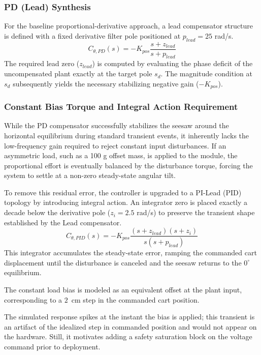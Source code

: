\documentclass[11pt,a4paper]{article}
\begin{document}
\subsubsection{PD (Lead) Synthesis}\label{subsub:pd_tuning}
For the baseline proportional-derivative approach, a lead compensator structure is defined with a fixed derivative filter pole positioned at $p_{lead} = 25$ rad/s.
\begin{equation}
C_{\theta,PD}(s) = -K_{pos} \frac{s + z_{lead}}{s + p_{lead}}
\end{equation}
The required lead zero ($z_{lead}$) is computed by evaluating the phase deficit of the uncompensated plant exactly at the target pole $s_d$. The magnitude condition at $s_d$ subsequently yields the necessary stabilizing negative gain ($-K_{pos}$).

\subsubsection{Constant Bias Torque and Integral Action Requirement}\label{subsub:freq_angle_control_load_bias}
While the PD compensator successfully stabilizes the seesaw around the horizontal equilibrium during standard transient events, it inherently lacks the low-frequency gain required to reject constant input disturbances. If an asymmetric load, such as a 100 g offset mass, is applied to the module, the proportional effort is eventually balanced by the disturbance torque, forcing the system to settle at a non-zero steady-state angular tilt.

To remove this residual error, the controller is upgraded to a PI-Lead (PID) topology by introducing integral action. An integrator zero is placed exactly a decade below the derivative pole ($z_i = 2.5$ rad/s) to preserve the transient shape established by the Lead compensator.
\begin{equation}
C_{\theta,PID}(s) = -K_{pos} \frac{(s + z_{lead})(s + z_i)}{s(s + p_{lead})}
\end{equation}
This integrator accumulates the steady-state error, ramping the commanded cart displacement until the disturbance is canceled and the seesaw returns to the $0^\circ$ equilibrium.

The constant load bias is modeled as an equivalent offset at the plant input, corresponding to a $2$~cm step in the commanded cart position.

The simulated response spikes at the instant the bias is applied; this transient is an artifact of the idealized step in commanded position and would not appear on the hardware. Still, it motivates adding a safety saturation block on the voltage command prior to deployment.
\end{document}
